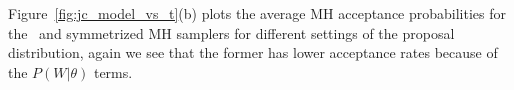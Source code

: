   Figure~\ref{fig:jc_model_vs_t}(b) plots the average MH acceptance probabilities for the \naive\ and symmetrized MH samplers for different settings of the proposal distribution, again we see that the former has lower acceptance rates because of the $P(W|\theta)$ terms.
